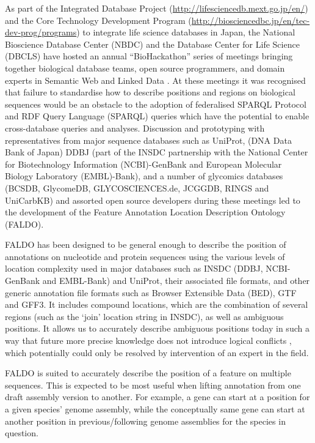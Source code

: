 As part of the Integrated Database Project (\url{http://lifesciencedb.mext.go.jp/en/}) and
the Core Technology Development Program (\url{http://biosciencedbc.jp/en/tec-dev-prog/programs})
to integrate life science databases in Japan, the National Bioscience Database Center (NBDC) and the Database
Center for Life Science (DBCLS) have hosted an annual ``BioHackathon'' series
of meetings bringing together biological database teams, open source programmers,
and domain experts in Semantic Web and Linked Data \cite{BioHack2008,BioHack2009,BioHack2010,BioHack2011and2012}.
At these meetings it was recognised that failure to standardise how to describe positions
and regions on biological sequences would be an obstacle to the adoption of federalised
SPARQL Protocol and RDF Query Language (SPARQL) queries which have the potential to enable cross-database queries and
analyses.
Discussion and prototyping with representatives from major sequence databases
such as UniProt\cite{UniProt2013}, (DNA Data Bank of Japan) DDBJ\cite{DDBJ2013} (part of the INSDC partnership with the National Center for Biotechnology Information (NCBI)-GenBank\cite{GenBank2013} and European Molecular Biology Laboratory (EMBL)-Bank\cite{ENA2013}),
and a number of glycomics databases 
(BCSDB\cite{doi:10.1021/ci100150d}, GlycomeDB\cite{Ranzinger01012011}, GLYCOSCIENCES.de\cite{Lutteke01052006}, JCGGDB, RINGS\cite{RINGS} and UniCarbKB\cite{UniCarbKB})
and assorted open source developers during these meetings
led to the development of the Feature Annotation Location Description Ontology (FALDO).

FALDO has been designed to be general enough to describe the position of annotations
on nucleotide and protein sequences using the various levels of location complexity used
in major databases such as INSDC (DDBJ, NCBI-GenBank and EMBL-Bank) and UniProt, their
associated file formats, and other generic annotation file formats such as Browser Extensible Data (BED),
GTF and GFF3. It includes compound locations, which are the combination of
several regions (such as the `join' location string in INSDC), as well as ambiguous
positions. It allows us to accurately describe ambiguous positions today
in such a way that future more precise knowledge does not introduce logical conflicts 
, which potentially could only be resolved by intervention of an expert in the field.

FALDO is suited to accurately describe the position of
a feature on multiple sequences.
This is expected to be most useful when lifting annotation from one
draft assembly version to another.
For example, a gene can start at a position for a given species' genome assembly,
while the conceptually same gene can start at another position in previous/following genome assemblies for the species in question.

